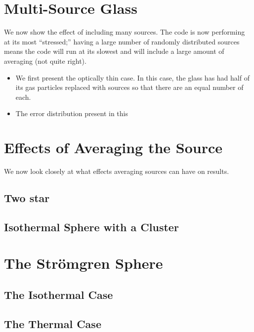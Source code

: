 \section{Multi-Source Glass}
\label{sec:multiglass}

We now show the effect of including many sources. The code is now performing at its most ``stressed;'' having a large number of randomly distributed sources means the code will run at its slowest and will include a large amount of averaging (not quite right).

\begin{itemize}
\item We first present the optically thin case. In this case, the glass has had half of its gas particles replaced with sources so that there are an equal number of each.
\item The error distribution present in this
\end{itemize}

\section{Effects of Averaging the Source}
\label{sec:averagingsource}

We now look closely at what effects averaging sources can have on results.

\subsection{Two star}
\label{sec:twostar}



\subsection{Isothermal Sphere with a Cluster}
\label{sec:cluster}



\section{The Str\"omgren Sphere}
\label{sec:stromgren}



\subsection{The Isothermal Case}
\label{sec:isostromgren}



\subsection{The Thermal Case}
\label{sec:thermalstromgren}



